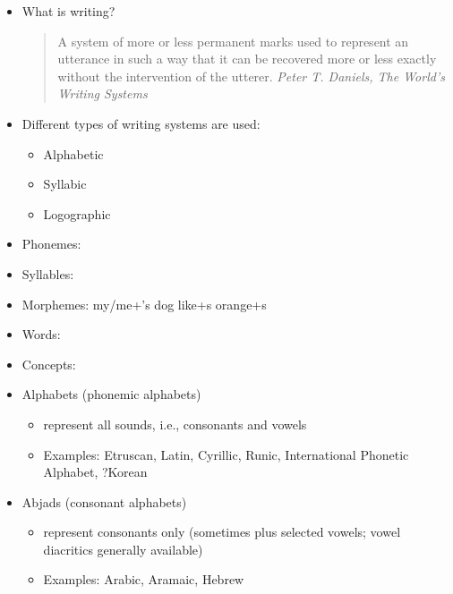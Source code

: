 \documentclass[a4paper,landscape,headrule,footrule,xetex]{foils}
\begin{document}

\begin{itemize}
\item What is writing?
\begin{quote}
  A system of more or less permanent marks used to represent an utterance in such a way that it can be recovered more or less exactly without the intervention of the utterer.  \hfill \textit{Peter T. Daniels, The World’s Writing Systems}
\end{quote}

\item Different types of writing systems are used:
\begin{itemize}
\item Alphabetic
\item Syllabic
\item Logographic
\end{itemize}
\end{itemize}





\begin{itemize}
\item Phonemes:   

\item Syllables:    
\item Morphemes:  my/me+'s dog like+s orange+s   
\item Words:  
\item Concepts:   
\end{itemize}




\begin{itemize}
\item Alphabets (phonemic alphabets)
\begin{itemize}
\item represent all sounds, i.e., consonants and vowels
\item Examples: Etruscan, Latin, Cyrillic, Runic, International Phonetic Alphabet, ?Korean 
\end{itemize}

\item Abjads (consonant alphabets)
\begin{itemize}
\item represent consonants only (sometimes plus selected vowels; vowel diacritics generally available)
\item Examples: Arabic, Aramaic, Hebrew
\end{itemize}
\end{itemize}
\end{document}
